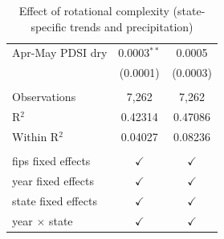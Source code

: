 \begin{table}[htbp]
{\begin{tabular}{lcc}
      Apr-May PDSI dry          & 0.0003$^{**}$           & 0.0005\\   
                                & (0.0001)                & (0.0003)\\   
       \\
      Observations              & 7,262                   & 7,262\\  
      R$^2$                     & 0.42314                 & 0.47086\\  
      Within R$^2$              & 0.04027                 & 0.08236\\  
       \\
      fips fixed effects        & $\checkmark$            & $\checkmark$\\   
      year fixed effects        & $\checkmark$            & $\checkmark$\\   
      state fixed effects       & $\checkmark$            & $\checkmark$\\   
      year $\times $ state      & $\checkmark$            & $\checkmark$\\   
      \bottomrule
   \end{tabular}}
      \caption{\label{tab:fit3} Effect of rotational complexity (state-specific trends and precipitation)}
\end{table}


